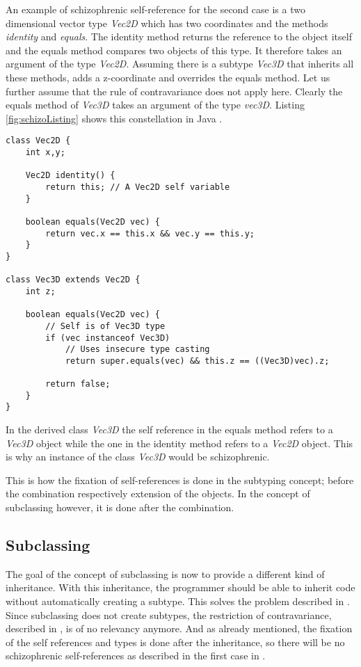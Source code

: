 An example of schizophrenic self-reference for the second case is a
two dimensional vector type \emph{Vec2D} which has two coordinates and
the methods \emph{identity} and \emph{equals}. The identity method
returns the reference to the object itself and the equals method
compares two objects of this type. It therefore takes an argument
of the type \emph{Vec2D}. Assuming there is a subtype \emph{Vec3D}
that inherits all these methods, adds a z-coordinate and overrides the
equals method. Let us further assume that the rule of contravariance
does not apply here. Clearly the equals method of \emph{Vec3D} takes
an argument of the type \emph{vec3D}. Listing \ref{fig:schizoListing}
shows this constellation in Java \cite{simons_theory_2003-2}.

\begin{lstlisting}[float,caption={An example of schizophrenic self-reference},label={fig:schizoListing}]
class Vec2D {
	int x,y;

	Vec2D identity() {
		return this; // A Vec2D self variable
	}

	boolean equals(Vec2D vec) {
		return vec.x == this.x && vec.y == this.y;
	}
}

class Vec3D extends Vec2D {
	int z;

	boolean equals(Vec2D vec) {
		// Self is of Vec3D type
		if (vec instanceof Vec3D)
			// Uses insecure type casting
			return super.equals(vec) && this.z == ((Vec3D)vec).z;

		return false;
	}
}
\end{lstlisting}

In the derived class \emph{Vec3D} the self reference in the equals
method refers to a \emph{Vec3D} object while the one in the identity method
refers to a \emph{Vec2D} object. This is why an instance of the class
\emph{Vec3D} would be schizophrenic.

This is how the fixation of self-references is done in the subtyping
concept; before the combination respectively extension of the objects. In the
concept of subclassing however, it is done after the combination.

\subsection{Subclassing} 
The goal of the concept of subclassing is now to provide a
different kind of inheritance. With this inheritance, the programmer
should be able to inherit code without automatically creating a subtype.
This solves the problem described in . Since
subclassing does not create subtypes, the restriction of contravariance,
described in , is of no relevancy
anymore. And as already mentioned, the fixation of the self references
and types is done after the inheritance, so there will be no schizophrenic
self-references as described in the first case in .

